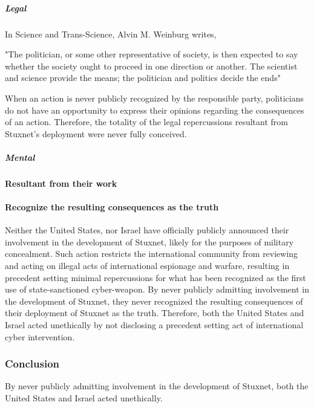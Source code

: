 \documentclass[12pt]{article}
\begin{document}
\begin{multicols}{2}
\subparagraph{Legal}

In Science and Trans-Science, Alvin M. Weinburg writes,

\begin{displayquote}
"The politician, or some other representative of society, is then expected to say whether the society ought to proceed in one direction or another. The scientist and science provide the means; the politician and politics decide the ends"\cite{scienceAndTransScience}
\end{displayquote}

When an action is never publicly recognized by the responsible party, politicians do not have an opportunity to express their opinions regarding the consequences of an action. Therefore, the totality of the legal repercussions resultant from Stuxnet's deployment were never fully conceived.

\subparagraph{Mental}

\paragraph{Resultant from their work}

\paragraph{Recognize the resulting consequences as the truth}

Neither the United States, nor Israel have officially publicly announced their involvement in the development of Stuxnet, likely for the purposes of military concealment. Such action restricts the international community from reviewing and acting on illegal acts of international espionage and warfare, resulting in precedent setting minimal repercussions for what has been recognized as the first use of state-sanctioned cyber-weapon. By never publicly admitting involvement in the development of Stuxnet, they never recognized the resulting consequences of their deployment of Stuxnet as the truth. Therefore, both the United States and Israel acted unethically by not disclosing a precedent setting act of international cyber intervention.

\subsubsection{Conclusion}

By never publicly admitting involvement in the development of Stuxnet, both the United States and Israel acted unethically.



\end{multicols}
\end{document}
